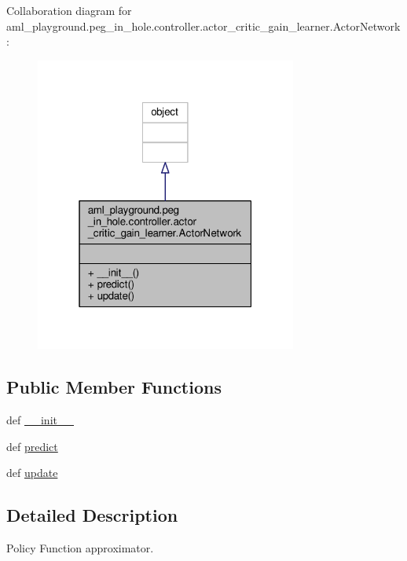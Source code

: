 Collaboration diagram for aml\-\_\-playground.\-peg\-\_\-in\-\_\-hole.\-controller.\-actor\-\_\-critic\-\_\-gain\-\_\-learner.\-Actor\-Network\-:\nopagebreak
\begin{figure}[H]
\begin{center}
\leavevmode
\includegraphics[width=244pt]{classaml__playground_1_1peg__in__hole_1_1controller_1_1actor__critic__gain__learner_1_1_actor_network__coll__graph}
\end{center}
\end{figure}
\subsection*{Public Member Functions}
\begin{DoxyCompactItemize}
\item 
def \hyperlink{classaml__playground_1_1peg__in__hole_1_1controller_1_1actor__critic__gain__learner_1_1_actor_network_afa3a417664d78c7adb12280234bc3d09}{\-\_\-\-\_\-init\-\_\-\-\_\-}
\item 
def \hyperlink{classaml__playground_1_1peg__in__hole_1_1controller_1_1actor__critic__gain__learner_1_1_actor_network_ad99555156aa4081b18aef59f3b34fa5b}{predict}
\item 
def \hyperlink{classaml__playground_1_1peg__in__hole_1_1controller_1_1actor__critic__gain__learner_1_1_actor_network_a65410bf7de2cf2f3c4e28f52ef5ec299}{update}
\end{DoxyCompactItemize}


\subsection{Detailed Description}
\begin{DoxyVerb}Policy Function approximator. 
\end{DoxyVerb}
 


